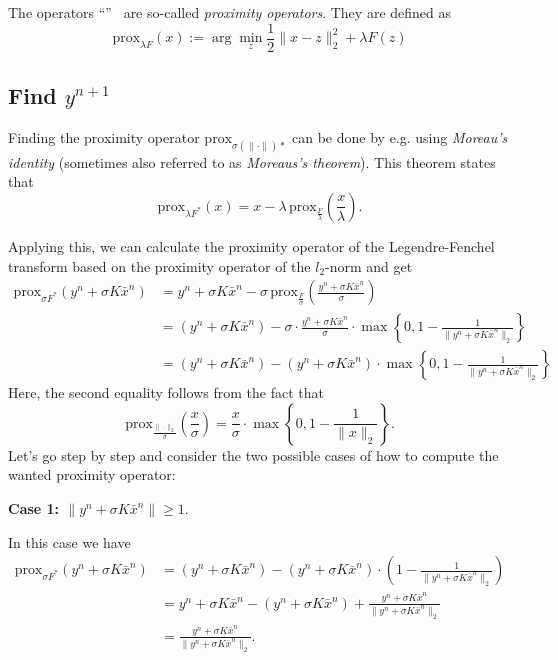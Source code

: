 \documentclass{paper}
\newcommand{\prox}{\text{prox}}
\begin{document}
The operators ``\prox'' \, are so-called \emph{proximity operators}. They are defined as 
\begin{equation}\prox_{\lambda F}(x) := \arg\min_z \frac{1}{2} \|x-z\|_2^2 + \lambda F(z)
\label{eq:def-proximity-operator}
\end{equation}

\subsection{Find $y^{n+1}$}
Finding the proximity operator $\prox_{\sigma (\|\cdot\|)*}$ can be done by e.g. using \emph{Moreau's identity} (sometimes also referred to as \emph{Moreaus's theorem}). This theorem states that
$$\prox_{\lambda F^*}(x) = x - \lambda\, \prox_{\frac{F}{\lambda}}\left(\frac{x}{\lambda}\right).$$

Applying this, we can calculate the proximity operator of the Legendre-Fenchel transform based on the proximity operator of the $l_2$-norm and get
\begin{align*}
 \prox_{\sigma F^*}(y^n + \sigma K \bar x^n) &= y^n + \sigma K \bar x^n - \sigma \, \prox_{\frac{F}{\sigma}}\left(\frac{y^n + \sigma K \bar x^n}{\sigma} \right) \\
 &= (y^n + \sigma K \bar x^n) - \sigma \cdot \frac{y^n + \sigma K \bar x^n}{\sigma} \cdot \max\left\{0, 1 - \frac{1}{\|y^n + \sigma K \bar x^n\|_2}\right\} \\
 &= (y^n + \sigma K \bar x^n) - (y^n + \sigma K \bar x^n) \cdot \max\left\{0, 1 - \frac{1}{\|y^n + \sigma K \bar x^n\|_2}\right\}
\end{align*}
Here, the second equality follows from the fact that $$\prox_{\frac{\|\cdot\|_2}{\sigma}}\left(\frac{x}{\sigma}\right) = \frac{x}{\sigma} \cdot \max\left\{0,1-\frac{1}{\|x\|_2}\right\}.$$
Let's go step by step and consider the two possible cases of how to compute the wanted proximity operator:

\textbf{Case 1: $\|y^n + \sigma K \bar x^n\| \geq 1.$}

In this case we have 
\begin{align*}
 \prox_{\sigma F^*}(y^n + \sigma K \bar x^n) &= (y^n + \sigma K \bar x^n) - (y^n + \sigma K \bar x^n) \cdot \left(1 - \frac{1}{\|y^n + \sigma K \bar x^n\|_2}\right) \\
 &= y^n + \sigma K \bar x^n - (y^n + \sigma K \bar x^n) + \frac{y^n + \sigma K \bar x^n}{\|y^n + \sigma K \bar x^n\|_2} \\
 &= \frac{y^n + \sigma K \bar x^n}{\|y^n + \sigma K \bar x^n\|_2}.
\end{align*}
\end{document}
